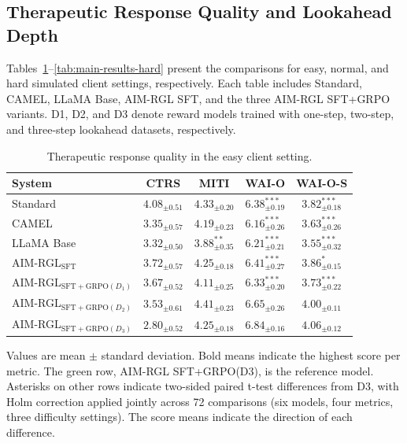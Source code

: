 \subsection{Therapeutic Response Quality and Lookahead Depth}

Tables~\ref{tab:main-results-easy}--\ref{tab:main-results-hard} present the comparisons for easy, normal, and hard simulated client settings, respectively. Each table includes Standard, CAMEL, LLaMA Base, AIM-RGL SFT, and the three AIM-RGL SFT+GRPO variants. D1, D2, and D3 denote reward models trained with one-step, two-step, and three-step lookahead datasets, respectively.

\begin{table}[H]
\centering
\caption{Therapeutic response quality in the easy client setting.}
\label{tab:main-results-easy}
\small
\setlength{\tabcolsep}{4pt}
\renewcommand{\arraystretch}{1.15}
\begin{tabular}{lcccc}
\toprule
System & CTRS & MITI & WAI-O & WAI-O-S \\
\midrule
Standard & $\mathbf{4.08}_{\pm 0.51}$ & $4.33_{\pm 0.20}$ & $6.38_{\pm 0.19}^{***}$ & $3.82_{\pm 0.18}^{***}$ \\
CAMEL & $3.35_{\pm 0.57}$ & $4.19_{\pm 0.23}$ & $6.16_{\pm 0.26}^{***}$ & $3.63_{\pm 0.26}^{***}$ \\
LLaMA Base & $3.32_{\pm 0.50}$ & $3.88_{\pm 0.35}^{**}$ & $6.21_{\pm 0.21}^{***}$ & $3.55_{\pm 0.32}^{***}$ \\
AIM-RGL$_{\mathrm{SFT}}$ & $3.72_{\pm 0.57}$ & $4.25_{\pm 0.18}$ & $6.41_{\pm 0.27}^{***}$ & $3.86_{\pm 0.15}^{*}$ \\
AIM-RGL$_{\mathrm{SFT+GRPO}(D_1)}$ & $3.67_{\pm 0.52}$ & $4.11_{\pm 0.25}$ & $6.33_{\pm 0.20}^{***}$ & $3.73_{\pm 0.22}^{***}$ \\
AIM-RGL$_{\mathrm{SFT+GRPO}(D_2)}$ & $3.53_{\pm 0.61}$ & $\mathbf{4.41}_{\pm 0.23}$ & $6.65_{\pm 0.26}$ & $4.00_{\pm 0.11}$ \\
\rowcolor{green!15}
AIM-RGL$_{\mathrm{SFT+GRPO}(D_3)}$ & $2.80_{\pm 0.52}$ & $4.25_{\pm 0.18}$ & $\mathbf{6.84}_{\pm 0.16}$ & $\mathbf{4.06}_{\pm 0.12}$ \\
\bottomrule
\end{tabular}
\par\smallskip
\begin{minipage}{\textwidth}
\footnotesize
\linespread{1.1}\selectfont
Values are mean $\pm$ standard deviation. Bold means indicate the highest score per metric. The green row, AIM-RGL SFT+GRPO(D3), is the reference model. Asterisks on other rows indicate two-sided paired t-test differences from D3, with Holm correction applied jointly across 72 comparisons (six models, four metrics, three difficulty settings). The score means indicate the direction of each difference.
\end{minipage}
\end{table}


